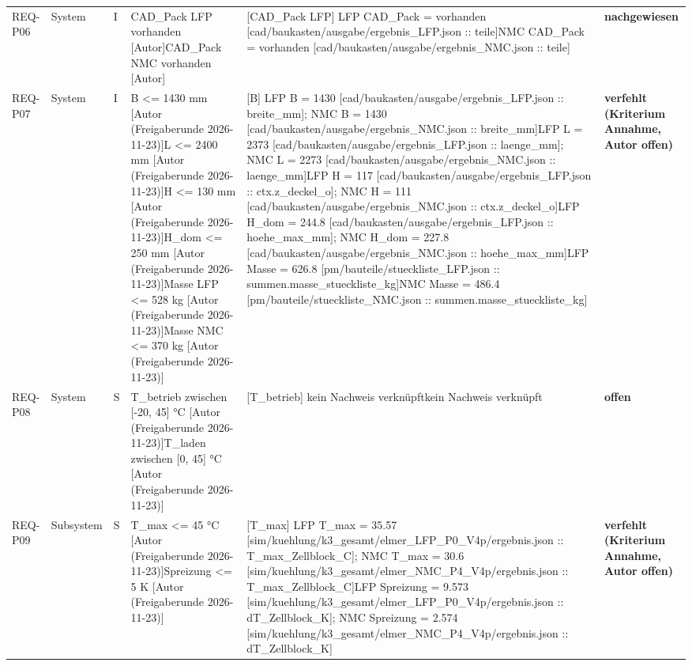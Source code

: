 \begin{longtable}{p{1.7cm}p{1.6cm}p{1.2cm}p{3.2cm}p{4.8cm}p{2.6cm}}
REQ-P06 & System & I & CAD\_Pack LFP vorhanden [Autor]\newline CAD\_Pack NMC vorhanden [Autor] & [CAD\_Pack LFP] LFP CAD\_Pack = vorhanden [cad/baukasten/ausgabe/ergebnis\_LFP.json :: teile] NMC CAD\_Pack = vorhanden [cad/baukasten/ausgabe/ergebnis\_NMC.json :: teile] & \textbf{nachgewiesen}\\
REQ-P07 & System & I & B <= 1430 mm [Autor (Freigaberunde 2026-11-23)]\newline L <= 2400 mm [Autor (Freigaberunde 2026-11-23)]\newline H <= 130 mm [Autor (Freigaberunde 2026-11-23)]\newline H\_dom <= 250 mm [Autor (Freigaberunde 2026-11-23)]\newline Masse LFP <= 528 kg [Autor (Freigaberunde 2026-11-23)]\newline Masse NMC <= 370 kg [Autor (Freigaberunde 2026-11-23)] & [B] LFP B = 1430 [cad/baukasten/ausgabe/ergebnis\_LFP.json :: breite\_mm]; NMC B = 1430 [cad/baukasten/ausgabe/ergebnis\_NMC.json :: breite\_mm]\newline [L] LFP L = 2373 [cad/baukasten/ausgabe/ergebnis\_LFP.json :: laenge\_mm]; NMC L = 2273 [cad/baukasten/ausgabe/ergebnis\_NMC.json :: laenge\_mm]\newline [H] LFP H = 117 [cad/baukasten/ausgabe/ergebnis\_LFP.json :: ctx.z\_deckel\_o]; NMC H = 111 [cad/baukasten/ausgabe/ergebnis\_NMC.json :: ctx.z\_deckel\_o]\newline [H\_dom] LFP H\_dom = 244.8 [cad/baukasten/ausgabe/ergebnis\_LFP.json :: hoehe\_max\_mm]; NMC H\_dom = 227.8 [cad/baukasten/ausgabe/ergebnis\_NMC.json :: hoehe\_max\_mm] LFP Masse = 626.8 [pm/bauteile/stueckliste\_LFP.json :: summen.masse\_stueckliste\_kg] NMC Masse = 486.4 [pm/bauteile/stueckliste\_NMC.json :: summen.masse\_stueckliste\_kg] & \textbf{verfehlt (Kriterium Annahme, Autor offen)}\\
REQ-P08 & System & S & T\_betrieb zwischen [-20, 45] °C [Autor (Freigaberunde 2026-11-23)]\newline T\_laden zwischen [0, 45] °C [Autor (Freigaberunde 2026-11-23)] & [T\_betrieb] kein Nachweis verknüpft\newline [T\_laden] kein Nachweis verknüpft & \textbf{offen}\\
REQ-P09 & Subsystem & S & T\_max <= 45 °C [Autor (Freigaberunde 2026-11-23)]\newline Spreizung <= 5 K [Autor (Freigaberunde 2026-11-23)] & [T\_max] LFP T\_max = 35.57 [sim/kuehlung/k3\_gesamt/elmer\_LFP\_P0\_V4p/ergebnis.json :: T\_max\_Zellblock\_C]; NMC T\_max = 30.6 [sim/kuehlung/k3\_gesamt/elmer\_NMC\_P4\_V4p/ergebnis.json :: T\_max\_Zellblock\_C]\newline [Spreizung] LFP Spreizung = 9.573 [sim/kuehlung/k3\_gesamt/elmer\_LFP\_P0\_V4p/ergebnis.json :: dT\_Zellblock\_K]; NMC Spreizung = 2.574 [sim/kuehlung/k3\_gesamt/elmer\_NMC\_P4\_V4p/ergebnis.json :: dT\_Zellblock\_K] & \textbf{verfehlt (Kriterium Annahme, Autor offen)}\\

\end{longtable}
